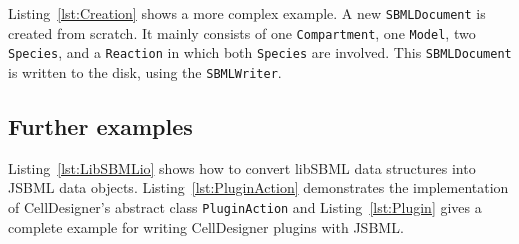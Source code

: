

Listing~\vref{lst:Creation} shows a more complex example. A new
\texttt{SBMLDocument} is created from scratch. It mainly consists of one
\texttt{Compartment}, one \texttt{Model}, two \texttt{Species}, and a
\texttt{Reaction} in which both \texttt{Species} are involved. This
\texttt{SBMLDocument} is written to the disk, using the \texttt{SBMLWriter}.

\subsection{Further examples}

Listing~\vref{lst:LibSBMLio} shows how to convert libSBML data structures into
JSBML data objects. Listing~\vref{lst:PluginAction} demonstrates the
implementation of CellDesigner's abstract class \texttt{PluginAction} and
Listing~\vref{lst:Plugin} gives a complete example for writing CellDesigner
plugins with JSBML.
